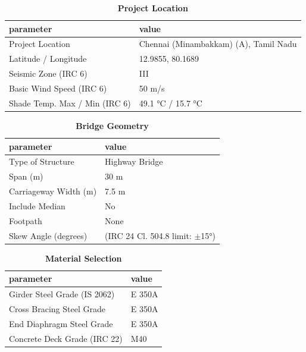 \documentclass[12pt,a4paper]{report}
\numberwithin{table}{chapter}
\numberwithin{figure}{chapter}
\begin{document}
\begin{table}[H]
\caption{\textbf{Project Location}}
\label{subsec:project-location}
\begin{tabular}{|L{5.5cm}|L{8.5cm}|}
\hline
\textbf{parameter} & \textbf{value} \\
\hline
\textnormal{Project Location} & Chennai (Minambakkam) (A), Tamil Nadu \\
\hline
\textnormal{Latitude / Longitude} & 12.9855, 80.1689 \\
\hline
\textnormal{Seismic Zone (IRC 6)} & III \\
\hline
\textnormal{Basic Wind Speed (IRC 6)} & 50 m/s \\
\hline
\textnormal{Shade Temp. Max / Min (IRC 6)} & 49.1 °C / 15.7 °C \\
\hline
\end{tabular}
\vspace{0.4cm}
\end{table}

\begin{table}[H]
\caption{\textbf{Bridge Geometry}}
\label{subsec:bridge-geometry}
\begin{tabular}{|L{5.5cm}|L{8.5cm}|}
\hline
\textbf{parameter} & \textbf{value} \\
\hline
\textnormal{Type of Structure} & Highway Bridge \\
\hline
\textnormal{Span (m)} & 30 m \\
\hline
\textnormal{Carriageway Width (m)} & 7.5 m \\
\hline
\textnormal{Include Median} & No \\
\hline
\textnormal{Footpath} & None \\
\hline
\textnormal{Skew Angle (degrees)} &  (IRC 24 Cl. 504.8 limit: $\pm$15°) \\
\hline
\end{tabular}
\end{table}
\vspace{0.4cm}

\begin{table}[H]
\caption{\textbf{Material Selection}}
\label{subsec:material}
\begin{tabular}{|L{5.5cm}|L{8.5cm}|}
\hline
\textbf{parameter} & \textbf{value} \\
\hline
\textnormal{Girder Steel Grade (IS 2062)} & E 350A \\
\hline
\textnormal{Cross Bracing Steel Grade} & E 350A \\
\hline
\textnormal{End Diaphragm Steel Grade} & E 350A \\
\hline
\textnormal{Concrete Deck Grade (IRC 22)} & M40 \\
\hline
\end{tabular}
\end{table}
\vspace{0.4cm}
\end{document}
